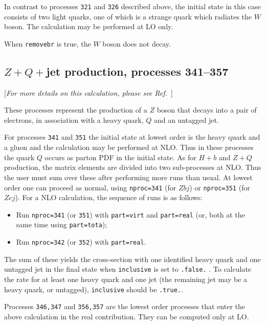In contrast to processes {\tt 321} and {\tt 326} described above, the initial
state in this case consists of two light quarks, one of which is a
strange quark which radiates the $W$ boson. The calculation may
be performed at LO only.

When {\tt removebr} is true, the $W$ boson does not decay.

\subsection{$Z+Q+$jet production, processes 341--357}
\label{subsec:ZQj}

\begin{center}
[{\it For more details on this calculation, please see Ref.~\cite{Campbell:2005zv}}]
\end{center}

These processes represent the production of a $Z$
boson that decays into a pair of electrons,
in association with a heavy quark, $Q$ and an untagged jet.

For processes {\tt 341} and {\tt 351} the initial state at lowest
order is the heavy quark and a gluon and the calculation may be
performed at NLO.  Thus in these processes the quark $Q$ occurs as
parton PDF in the initial state.  As for $H+b$ and $Z+Q$ production,
the matrix elements are divided into two sub-processes at NLO. Thus
the user must sum over these after performing more runs than usual. At
lowest order one can proceed as normal, using {\tt nproc=341} (for
$Zbj$) or {\tt nproc=351} (for $Zcj$).  For a NLO calculation, the
sequence of runs is as follows:
\begin{itemize}
\item Run {\tt nproc=341} (or {\tt 351}) with {\tt part=virt} and
{\tt part=real} (or, both at the same time using {\tt part=tota});
\item Run {\tt nproc=342} (or {\tt 352}) with {\tt part=real}.
\end{itemize}
The sum of these yields the cross-section with one identified heavy
quark and one untagged jet in the final state when {\tt inclusive} is
set to {\tt .false.} . To calculate the rate for at least one heavy
quark and one jet (the remaining jet may be a heavy quark, or
untagged), {\tt inclusive} should be {\tt .true.}.

Processes {\tt 346,347} and {\tt 356,357} are the lowest order processes that enter
the above calculation in the real contribution. They can be computed only at LO.

